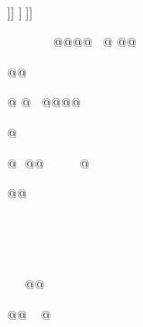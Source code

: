 

















]]
]]]



















@@@@@
@@


@@






@
@@@@@

@







@
@@@


@@


























































@@

@@@




